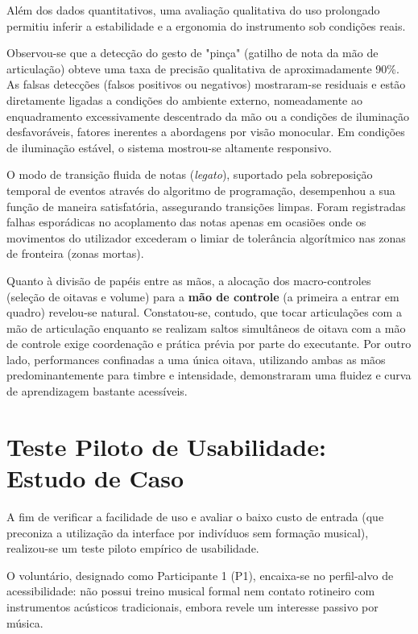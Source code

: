 Além dos dados quantitativos, uma avaliação qualitativa do uso prolongado permitiu inferir a estabilidade e a ergonomia do instrumento sob condições reais.

Observou-se que a detecção do gesto de "pinça" (gatilho de nota da mão de articulação) obteve uma taxa de precisão qualitativa de aproximadamente 90\%. As falsas detecções (falsos positivos ou negativos) mostraram-se residuais e estão diretamente ligadas a condições do ambiente externo, nomeadamente ao enquadramento excessivamente descentrado da mão ou a condições de iluminação desfavoráveis, fatores inerentes a abordagens por visão monocular. Em condições de iluminação estável, o sistema mostrou-se altamente responsivo.

O modo de transição fluida de notas (\textit{legato}), suportado pela sobreposição temporal de eventos através do algoritmo de programação, desempenhou a sua função de maneira satisfatória, assegurando transições limpas. Foram registradas falhas esporádicas no acoplamento das notas apenas em ocasiões onde os movimentos do utilizador excederam o limiar de tolerância algorítmico nas zonas de fronteira (zonas mortas).

Quanto à divisão de papéis entre as mãos, a alocação dos macro-controles (seleção de oitavas e volume) para a \textbf{mão de controle} (a primeira a entrar em quadro) revelou-se natural. Constatou-se, contudo, que tocar articulações com a mão de articulação enquanto se realizam saltos simultâneos de oitava com a mão de controle exige coordenação e prática prévia por parte do executante. Por outro lado, performances confinadas a uma única oitava, utilizando ambas as mãos predominantemente para timbre e intensidade, demonstraram uma fluidez e curva de aprendizagem bastante acessíveis.

\section{Teste Piloto de Usabilidade: Estudo de Caso}
\label{sec:teste_usabilidade}

A fim de verificar a facilidade de uso e avaliar o baixo custo de entrada (que preconiza a utilização da interface por indivíduos sem formação musical), realizou-se um teste piloto empírico de usabilidade.

O voluntário, designado como Participante 1 (P1), encaixa-se no perfil-alvo de acessibilidade: não possui treino musical formal nem contato rotineiro com instrumentos acústicos tradicionais, embora revele um interesse passivo por música. 


